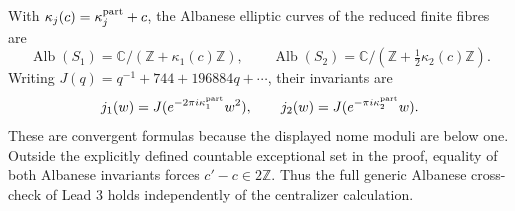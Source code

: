 \begin{proposition}\label{fam:src:A.4.1}\label{fam:st:A.4.1}
With $\kappa_j(c)=\kappa_j^{\rm part}+c$, the Albanese elliptic curves of the reduced finite fibres are
\[
 \operatorname{Alb}(S_1)=\mathbb C/(\mathbb Z+\kappa_1(c)\mathbb Z),\qquad
 \operatorname{Alb}(S_2)=\mathbb C/(\mathbb Z+\tfrac12\kappa_2(c)\mathbb Z).
\]
Writing $J(q)=q^{-1}+744+196884q+\cdots$, their invariants are
\[
 j_1(w)=J(e^{-2\pi i\kappa_1^{\rm part}}w^2),\qquad
 j_2(w)=J(e^{-\pi i\kappa_2^{\rm part}}w).
\]
These are convergent formulas because the displayed nome moduli are below one. Outside the explicitly defined countable exceptional set in the proof, equality of both Albanese invariants forces $c'-c\in2\mathbb Z$. Thus the full generic Albanese cross-check of Lead 3 holds independently of the centralizer calculation.
\end{proposition}
